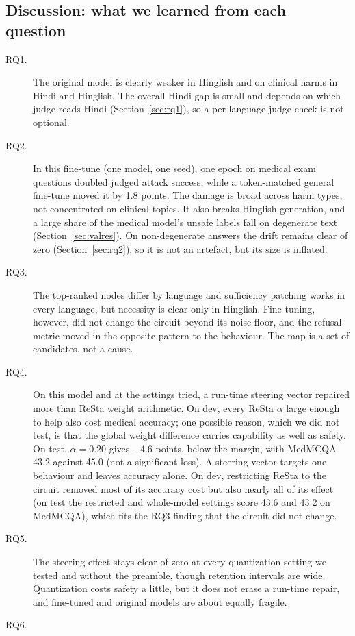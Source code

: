 \subsection{Discussion: what we learned from each question}
\begin{description}
\item[RQ1.] The original model is clearly weaker in Hinglish and on clinical harms in Hindi and Hinglish. The overall Hindi gap is small and depends on which judge reads Hindi (Section~\ref{sec:rq1}), so a per-language judge check is not optional.
\item[RQ2.] In this fine-tune (one model, one seed), one epoch on medical exam questions doubled judged attack success, while a token-matched general fine-tune moved it by 1.8 points. The damage is broad across harm types, not concentrated on clinical topics. It also breaks Hinglish generation, and a large share of the medical model's unsafe labels fall on degenerate text (Section~\ref{sec:valres}). On non-degenerate answers the drift remains clear of zero (Section~\ref{sec:rq2}), so it is not an artefact, but its size is inflated.
\item[RQ3.] The top-ranked nodes differ by language and sufficiency patching works in every language, but necessity is clear only in Hinglish. Fine-tuning, however, did not change the circuit beyond its noise floor, and the refusal metric moved in the opposite pattern to the behaviour. The map is a set of candidates, not a cause.
\item[RQ4.] On this model and at the settings tried, a run-time steering vector repaired more than ReSta weight arithmetic. On dev, every ReSta $\alpha$ large enough to help also cost medical accuracy; one possible reason, which we did not test, is that the global weight difference carries capability as well as safety. On test, $\alpha=0.20$ gives $-4.6$ points, below the margin, with MedMCQA 43.2 against 45.0 (not a significant loss). A steering vector targets one behaviour and leaves accuracy alone. On dev, restricting ReSta to the circuit removed most of its accuracy cost but also nearly all of its effect (on test the restricted and whole-model settings score 43.6 and 43.2 on MedMCQA), which fits the RQ3 finding that the circuit did not change.
\item[RQ5.] The steering effect stays clear of zero at every quantization setting we tested and without the preamble, though retention intervals are wide. Quantization costs safety a little, but it does not erase a run-time repair, and fine-tuned and original models are about equally fragile.
\item[RQ6.] %
\end{description}

